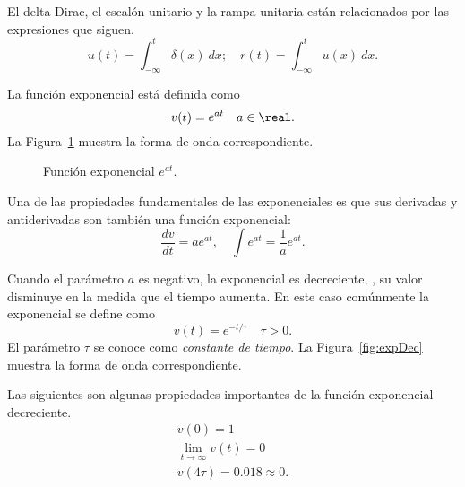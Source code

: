 \documentclass[paper=letter, fontsize=11pt]{scrartcl}
\begin{document}
El delta Dirac, el escalón unitario y la rampa unitaria están relacionados por
las expresiones que siguen.
%
\begin{equation*}
  u(t) = \int_{-\infty}^t \delta(x) \ dx; \quad
  r(t) = \int_{-\infty}^t u(x) \ dx.
\end{equation*}

\begin{defi}[Exponencial]

La función exponencial está definida como
%
\begin{equation}
  v(t) = e^{at} \quad a \in \real.
\end{equation}
%
La Figura~\ref{fig:exp} muestra la forma de onda correspondiente.
\end{defi}

\begin{figure}[h!]
  \centering
  \caption{Función exponencial $e^{at}$.}
\label{fig:exp}
\end{figure}

Una de las propiedades fundamentales de las exponenciales es que sus derivadas
y antiderivadas son también una función exponencial:
%
\begin{equation}
  \frac{dv}{dt} = a e^{at}, \quad \int e^{at} = \frac{1}{a} e^{at}.
\end{equation}

Cuando el parámetro $a$ es negativo, la exponencial es decreciente, \ie, su
valor disminuye en la medida que el tiempo aumenta. En este caso comúnmente la
exponencial se define como
%
\begin{equation}
  v(t) = e^{-t/\tau} \quad \tau > 0.
\end{equation}
%
El parámetro $\tau$ se conoce como \emph{constante de tiempo}. La
Figura~\ref{fig:expDec} muestra la forma de onda correspondiente.

Las siguientes son algunas propiedades importantes de la función exponencial
decreciente.
%
\begin{gather}
  v(0) = 1 \\
  \lim_{t \to \infty} v(t) = 0 \\
  v(4\tau) = 0.018 \approx 0.
\end{gather}
\end{document}
